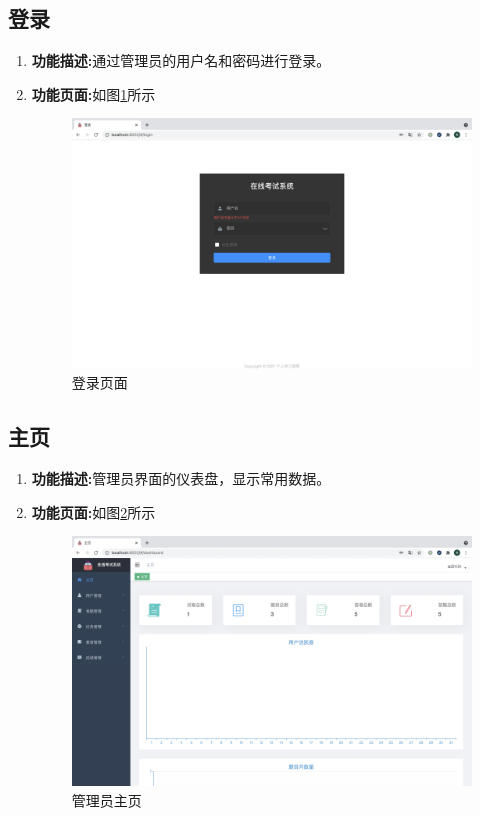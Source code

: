 \subsection{登录}
\begin{enumerate}
	\item[] \textbf{功能描述:}通过管理员的用户名和密码进行登录。
	\item[] \textbf{功能页面:}如图\ref{figure:denglu}所示 \\
		\begin{figure}[H]
			\centering
			\includegraphics[width=1.0\textwidth,keepaspectratio]{data/chapter-5/denglu.png}
			\caption{登录页面}
			\label{figure:denglu}
		\end{figure}
\end{enumerate}

\subsection{主页}
\begin{enumerate}
	\item[] \textbf{功能描述:}管理员界面的仪表盘，显示常用数据。
	\item[] \textbf{功能页面:}如图\ref{figure:zhuye}所示 \\
		\begin{figure}[H]
			\centering
			\includegraphics[width=1.0\textwidth,keepaspectratio]{data/chapter-5/zhuye.png}
			\caption{管理员主页}
			\label{figure:zhuye}
		\end{figure}
\end{enumerate}

